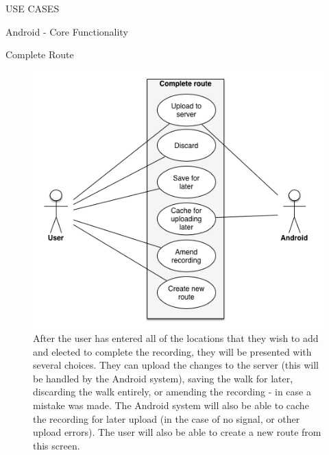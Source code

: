 \documentclass{article}
\begin{document}
\begin{section}{USE CASES}
\begin{subsection}{Android - Core Functionality}
			\clearpage
			\begin{subsubsection}{Complete Route}
				\begin{figure}[h!]
					\begin{center}
						\includegraphics[height=0.7\columnwidth]{images/UseCase/Android/Core/CompleteRoute.png}
					\end{center}
					\caption{After the user has entered all of the locations that they wish to add and elected to complete the recording, they will be presented with several choices. They can upload the changes to the server (this will be handled by the Android system), saving the walk for later, discarding the walk entirely, or amending the recording - in case a mistake was made. The Android system will also be able to cache the recording for later upload (in the case of no signal, or other upload errors). The user will also be able to create a new route from this screen.}
				\end{figure}
			\end{subsubsection}
			

\end{subsection}
\end{section}
\end{document}

